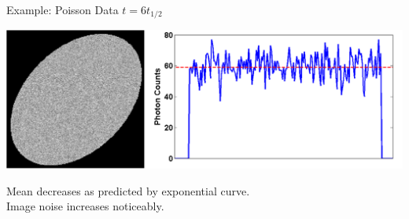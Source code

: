\begin{frame}{Example: Poisson Data $t = 6t_{1/2}$}
    \begin{centering}
        \includegraphics[width=1\textwidth]{images/poisD}\\
    \end{centering}
    Mean decreases as predicted by exponential curve. \\[0.25cm]
    Image noise increases noticeably.
\end{frame}








